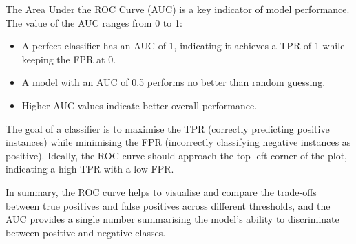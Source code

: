 		The Area Under the ROC Curve (AUC) is a key indicator of model performance. The value of the AUC ranges from 0 to 1:
		
		
		\begin{itemize}
			\item A perfect classifier has an AUC of 1, indicating it achieves a TPR of 1 while keeping the FPR at 0.
			\item A model with an AUC of 0.5 performs no better than random guessing.
			\item Higher AUC values indicate better overall performance.
		\end{itemize}
		\bigskip
		
		The goal of a classifier is to maximise the TPR (correctly predicting positive instances) while minimising the FPR (incorrectly classifying negative instances as positive). Ideally, the ROC curve should approach the top-left corner of the plot, indicating a high TPR with a low FPR.
		
		In summary, the ROC curve helps to visualise and compare the trade-offs between true positives and false positives across different thresholds, and the AUC provides a single number summarising the model's ability to discriminate between positive and negative classes.
	
	
